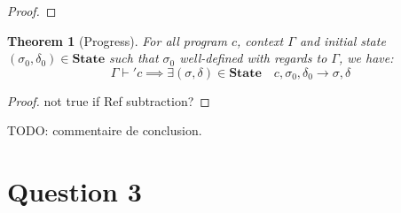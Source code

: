 \documentclass{article}
\newtheorem{thm}{Theorem}
\newcommand{\state}{\mathbf{State}}
\begin{document}
\begin{proof}
\end{proof}


\begin{thm}[Progress]
For all program $c$, context $\Gamma$ and initial state $(\sigma_0, \delta_0) \in \state{}$ such that $\sigma_0$ well-defined with regards to $\Gamma$, we have:
\[
\Gamma \vdash' c \implies \exists (\sigma, \delta) \in \state{} \quad c, \sigma_0, \delta_0 \longrightarrow \sigma, \delta
\]
\end{thm}

\begin{proof}
not true if Ref subtraction?
\end{proof}

TODO: commentaire de conclusion.


\section*{Question 3}
\end{document}
